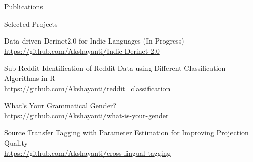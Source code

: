 \documentclass{resume}
\begin{document}
\begin{rSection}{Publications}

    {}

    {}

    {}
    
    {}

    {}

\end{rSection}



\begin{rSection}{Selected Projects}

    {Data-driven Derinet2.0 for Indic Languages (In Progress)}\\
        \url{https://github.com/Akshayanti/Indic-Derinet-2.0}

    {Sub-Reddit Identification of Reddit Data using Different Classification Algorithms in R}\\
        \url{https://github.com/Akshayanti/reddit_classification}

    {What's Your Grammatical Gender?}\\
        \url{https://github.com/Akshayanti/what-is-your-gender}

    {Source Transfer Tagging with Parameter Estimation for Improving Projection Quality}\\
        \url{https://github.com/Akshayanti/cross-lingual-tagging}

\end{rSection}


\end{document}
